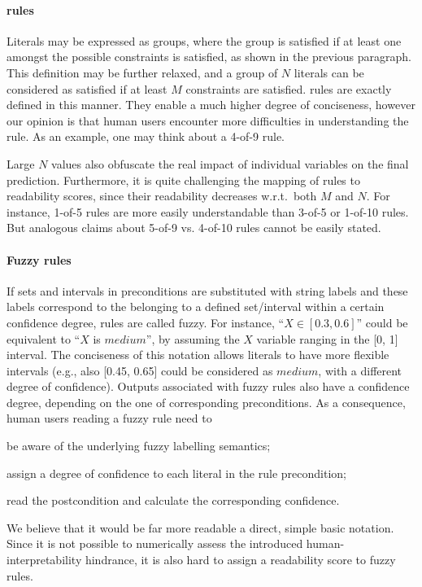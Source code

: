\documentclass[sigconf]{acmart}
\begin{document}
\paragraph{\mofn{} rules}

Literals may be expressed as groups, where the group is satisfied if at least one amongst the possible constraints is satisfied, as shown in the previous paragraph.
%
This definition may be further relaxed, and a group of $N$ literals can be considered as satisfied if at least $M$ constraints are satisfied.
%
\mofn{} rules are exactly defined in this manner.
%
They enable a much higher degree of conciseness, however our opinion is that human users encounter more difficulties in understanding the rule.
%
As an example, one may think about a 4-of-9 rule.

Large $N$ values also obfuscate the real impact of individual variables on the final prediction.
%
Furthermore, it is quite challenging the mapping of \mofn{} rules to readability scores, since their readability decreases w.r.t.\ both $M$ and $N$.
%
For instance, 1-of-5 rules are more easily understandable than 3-of-5 or 1-of-10 rules.
%
But analogous claims about 5-of-9 vs. 4-of-10 rules cannot be easily stated.

\paragraph{Fuzzy rules}

If sets and intervals in preconditions are substituted with string labels and these labels correspond to the belonging to a defined set/interval within a certain confidence degree, rules are called fuzzy.
%
For instance, ``$X \in [0.3, 0.6]$'' could be equivalent to ``$X$ is $medium$'', by assuming the $X$ variable ranging in the [0, 1] interval.
%
The conciseness of this notation allows literals to have more flexible intervals (e.g., also [0.45, 0.65] could be considered as $medium$, with a different degree of confidence).
%
Outputs associated with fuzzy rules also have a confidence degree, depending on the one of corresponding preconditions.
%
As a consequence, human users reading a fuzzy rule need to
%
\begin{inlinelist}
	\item be aware of the underlying fuzzy labelling semantics;
	\item assign a degree of confidence to each literal in the rule precondition;
	\item read the postcondition and calculate the corresponding confidence.
\end{inlinelist}
%
We believe that it would be far more readable a direct, simple basic notation.
%
Since it is not possible to numerically assess the introduced human-interpretability hindrance, it is also hard to assign a readability score to fuzzy rules.
\end{document}
